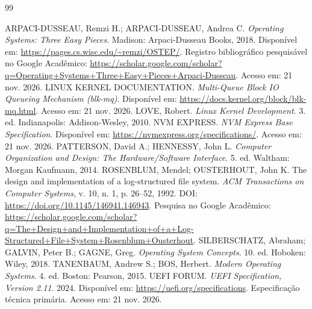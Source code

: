 \documentclass[12pt,a4paper,oneside]{article}
\begin{document}
\begin{thebibliography}{99}
 ARPACI-DUSSEAU, Remzi H.; ARPACI-DUSSEAU, Andrea C. \textit{Operating Systems: Three Easy Pieces}. Madison: Arpaci-Dusseau Books, 2018. Disponível em: \url{https://pages.cs.wisc.edu/~remzi/OSTEP/}. Registro bibliográfico pesquisável no Google Acadêmico: \url{https://scholar.google.com/scholar?q=Operating+Systems+Three+Easy+Pieces+Arpaci-Dusseau}. Acesso em: 21 nov. 2026.
 LINUX KERNEL DOCUMENTATION. \textit{Multi-Queue Block IO Queueing Mechanism (blk-mq)}. Disponível em: \url{https://docs.kernel.org/block/blk-mq.html}. Acesso em: 21 nov. 2026.
 LOVE, Robert. \textit{Linux Kernel Development}. 3. ed. Indianapolis: Addison-Wesley, 2010.
 NVM EXPRESS. \textit{NVM Express Base Specification}. Disponível em: \url{https://nvmexpress.org/specifications/}. Acesso em: 21 nov. 2026.
 PATTERSON, David A.; HENNESSY, John L. \textit{Computer Organization and Design: The Hardware/Software Interface}. 5. ed. Waltham: Morgan Kaufmann, 2014.
 ROSENBLUM, Mendel; OUSTERHOUT, John K. The design and implementation of a log-structured file system. \textit{ACM Transactions on Computer Systems}, v. 10, n. 1, p. 26--52, 1992. DOI: \url{https://doi.org/10.1145/146941.146943}. Pesquisa no Google Acadêmico: \url{https://scholar.google.com/scholar?q=The+Design+and+Implementation+of+a+Log-Structured+File+System+Rosenblum+Ousterhout}.
 SILBERSCHATZ, Abraham; GALVIN, Peter B.; GAGNE, Greg. \textit{Operating System Concepts}. 10. ed. Hoboken: Wiley, 2018.
 TANENBAUM, Andrew S.; BOS, Herbert. \textit{Modern Operating Systems}. 4. ed. Boston: Pearson, 2015.
 UEFI FORUM. \textit{UEFI Specification, Version 2.11}. 2024. Disponível em: \url{https://uefi.org/specifications}. Especificação técnica primária. Acesso em: 21 nov. 2026.
\end{thebibliography}
\end{document}
